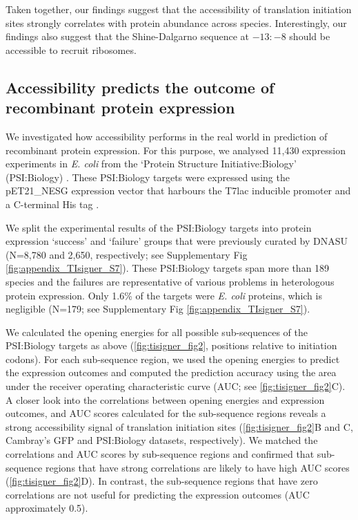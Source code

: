 Taken together, our findings suggest that the accessibility of translation initiation sites strongly correlates with protein abundance across species. Interestingly, our findings also suggest that the Shine-Dalgarno sequence \cite{Shine1974-kl} at $−13:−8$ should be accessible to recruit ribosomes.

\subsection{Accessibility predicts the outcome of recombinant protein expression}
We investigated how accessibility performs in the real world in prediction of recombinant protein expression. For this purpose, we analysed 11,430 expression experiments in \textit{E. coli} from the ‘Protein Structure Initiative:Biology’ (PSI:Biology) \cite{Chen2004-cp,Seiler2014-on,Acton2005-ng}. These PSI:Biology targets were expressed using the pET21\_NESG expression vector that harbours the T7lac inducible promoter and a C-terminal His tag \cite{Acton2005-ng}.

We split the experimental results of the PSI:Biology targets into protein expression ‘success’ and ‘failure’ groups that were previously curated by DNASU (N=8,780 and 2,650, respectively; see Supplementary Fig \ref{fig:appendix_TIsigner_S7}). These PSI:Biology targets span more than 189 species and the failures are representative of various problems in heterologous protein expression. Only 1.6\% of the targets were \textit{E. coli} proteins, which is negligible (N=179; see Supplementary Fig \ref{fig:appendix_TIsigner_S7}).

We calculated the opening energies for all possible sub-sequences of the PSI:Biology targets as above (\ref{fig:tisigner_fig2}, positions relative to initiation codons). For each sub-sequence region, we used the opening energies to predict the expression outcomes and computed the prediction accuracy using the area under the receiver operating characteristic curve (AUC; see \ref{fig:tisigner_fig2}C). A closer look into the correlations between opening energies and expression outcomes, and AUC scores calculated for the sub-sequence regions reveals a strong accessibility signal of translation initiation sites (\ref{fig:tisigner_fig2}B and C, Cambray’s GFP and PSI:Biology datasets, respectively). We matched the correlations and AUC scores by sub-sequence regions and confirmed that sub-sequence regions that have strong correlations are likely to have high AUC scores (\ref{fig:tisigner_fig2}D). In contrast, the sub-sequence regions that have zero correlations are not useful for predicting the expression outcomes (AUC approximately 0.5).

